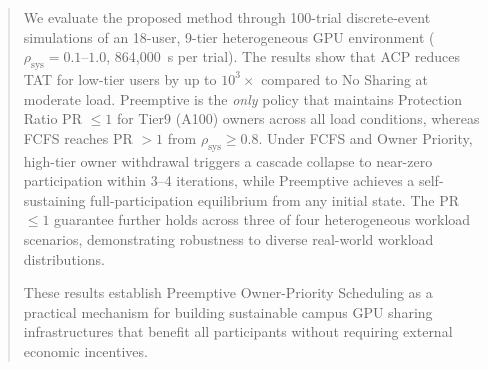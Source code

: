 \begin{abstract}
We evaluate the proposed method through 100-trial discrete-event simulations
of an 18-user, 9-tier heterogeneous GPU environment
($\rho_\mathrm{sys} = 0.1$--$1.0$, 864,000~s per trial).
The results show that ACP reduces TAT for low-tier users by up to $10^3\times$
compared to No Sharing at moderate load.
Preemptive is the \emph{only} policy that maintains
Protection Ratio PR $\leq 1$ for Tier9 (A100) owners across all load conditions,
whereas FCFS reaches PR $> 1$ from $\rho_\mathrm{sys} \geq 0.8$.
Under FCFS and Owner Priority, high-tier owner withdrawal triggers a cascade
collapse to near-zero participation within 3--4 iterations,
while Preemptive achieves a self-sustaining full-participation equilibrium
from any initial state.
The PR $\leq 1$ guarantee further holds across three of four
heterogeneous workload scenarios, demonstrating robustness to diverse
real-world workload distributions.


These results establish Preemptive Owner-Priority Scheduling as a practical
mechanism for building sustainable campus GPU sharing infrastructures
that benefit all participants without requiring external economic incentives.


\end{abstract}
